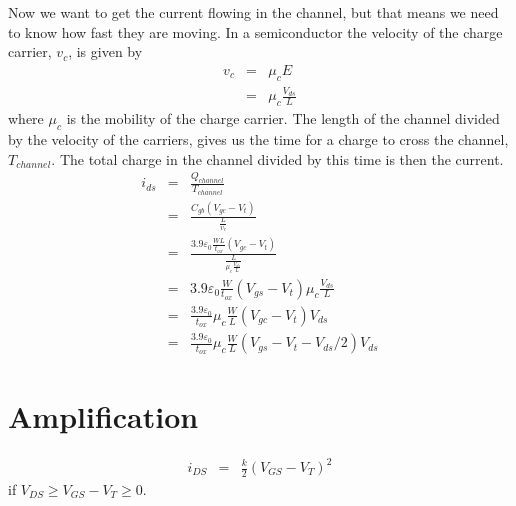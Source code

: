 Now we want to get the current flowing in the channel, but that means we need to know how fast they are moving.  In a semiconductor the velocity of the charge carrier, $v_c$, is given by
\begin{eqnarray}
v_c &=& \mu_cE\\
&=&\mu_c\frac{V_{ds}}{L}
\end{eqnarray}
where $\mu_c$ is the mobility of the charge carrier.  The length of the channel divided by the velocity of the carriers, gives us the time for a charge to cross the channel, $T_{channel}$.  The total charge in the channel divided by this time is then the current.
\begin{eqnarray}
i_{ds} &=& \frac{Q_{channel}}{T_{channel}}\\
 &=& \frac{C_{gb}(V_{gc}-V_t)}{\frac{L}{v_c}}\\
 &=& \frac{3.9\varepsilon_0\frac{WL}{t_{ox}}(V_{gc}-V_t)}{\frac{L}{\mu_c\frac{V_{ds}}{L}}}\\
 &=& 3.9\varepsilon_0\frac{W}{t_{ox}}(V_{gs}-V_t)\mu_c\frac{V_{ds}}{L}\\
 &=& \frac{3.9\varepsilon_0}{t_{ox}}\mu_c\frac{W}{L}(V_{gc}-V_t)V_{ds}\\
 &=& \frac{3.9\varepsilon_0}{t_{ox}}\mu_c\frac{W}{L}(V_{gs}-V_t-V_{ds}/2)V_{ds}
\end{eqnarray}


\section{Amplification}

\begin{eqnarray}
i_{DS} &=& \frac{k}{2}(V_{GS}-V_T)^2
\end{eqnarray}
if $V_{DS} \geq V_{GS}-V_T\geq 0$. 